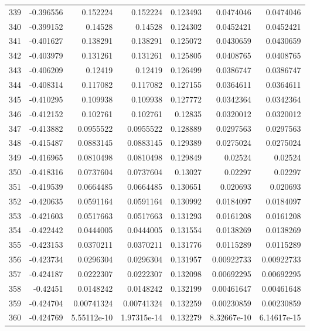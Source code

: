 \begin{tabular}{rrrrrrr}
 339 & -0.396556    & 0.152224    & 0.152224    &  0.123493    & 0.0474046   & 0.0474046   \\
 340 & -0.399152    & 0.14528     & 0.14528     &  0.124302    & 0.0452421   & 0.0452421   \\
 341 & -0.401627    & 0.138291    & 0.138291    &  0.125072    & 0.0430659   & 0.0430659   \\
 342 & -0.403979    & 0.131261    & 0.131261    &  0.125805    & 0.0408765   & 0.0408765   \\
 343 & -0.406209    & 0.12419     & 0.12419     &  0.126499    & 0.0386747   & 0.0386747   \\
 344 & -0.408314    & 0.117082    & 0.117082    &  0.127155    & 0.0364611   & 0.0364611   \\
 345 & -0.410295    & 0.109938    & 0.109938    &  0.127772    & 0.0342364   & 0.0342364   \\
 346 & -0.412152    & 0.102761    & 0.102761    &  0.12835     & 0.0320012   & 0.0320012   \\
 347 & -0.413882    & 0.0955522   & 0.0955522   &  0.128889    & 0.0297563   & 0.0297563   \\
 348 & -0.415487    & 0.0883145   & 0.0883145   &  0.129389    & 0.0275024   & 0.0275024   \\
 349 & -0.416965    & 0.0810498   & 0.0810498   &  0.129849    & 0.02524     & 0.02524     \\
 350 & -0.418316    & 0.0737604   & 0.0737604   &  0.13027     & 0.02297     & 0.02297     \\
 351 & -0.419539    & 0.0664485   & 0.0664485   &  0.130651    & 0.020693    & 0.020693    \\
 352 & -0.420635    & 0.0591164   & 0.0591164   &  0.130992    & 0.0184097   & 0.0184097   \\
 353 & -0.421603    & 0.0517663   & 0.0517663   &  0.131293    & 0.0161208   & 0.0161208   \\
 354 & -0.422442    & 0.0444005   & 0.0444005   &  0.131554    & 0.0138269   & 0.0138269   \\
 355 & -0.423153    & 0.0370211   & 0.0370211   &  0.131776    & 0.0115289   & 0.0115289   \\
 356 & -0.423734    & 0.0296304   & 0.0296304   &  0.131957    & 0.00922733  & 0.00922733  \\
 357 & -0.424187    & 0.0222307   & 0.0222307   &  0.132098    & 0.00692295  & 0.00692295  \\
 358 & -0.42451     & 0.0148242   & 0.0148242   &  0.132199    & 0.00461647  & 0.00461648  \\
 359 & -0.424704    & 0.00741324  & 0.00741324  &  0.132259    & 0.00230859  & 0.00230859  \\
 360 & -0.424769    & 5.55112e-10 & 1.97315e-14 &  0.132279    & 8.32667e-10 & 6.14617e-15 \\
\hline
\end{tabular}
